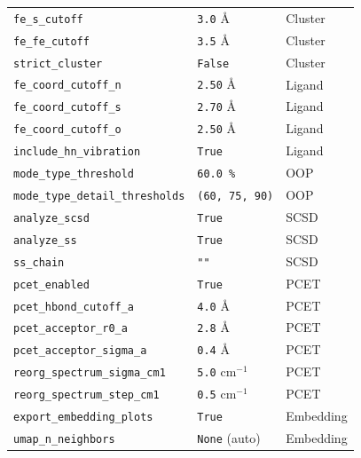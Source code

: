 \documentclass[11pt,a4paper,twoside]{article}
\theoremstyle{remark}
\begin{document}
\begin{longtable}{p{} p{} p{}}
\texttt{fe\_s\_cutoff}              & \texttt{3.0} \AA     & Cluster \\
\texttt{fe\_fe\_cutoff}             & \texttt{3.5} \AA     & Cluster \\
\texttt{strict\_cluster}            & \texttt{False}       & Cluster \\
\midrule
\texttt{fe\_coord\_cutoff\_n}       & \texttt{2.50} \AA    & Ligand \\
\texttt{fe\_coord\_cutoff\_s}       & \texttt{2.70} \AA    & Ligand \\
\texttt{fe\_coord\_cutoff\_o}       & \texttt{2.50} \AA    & Ligand \\
\texttt{include\_hn\_vibration}     & \texttt{True}        & Ligand \\
\midrule
\texttt{mode\_type\_threshold}      & \texttt{60.0\,\%}    & OOP \\
\texttt{mode\_type\_detail\_thresholds} & \texttt{(60, 75, 90)} & OOP \\
\midrule
\texttt{analyze\_scsd}              & \texttt{True}        & SCSD \\
\texttt{analyze\_ss}                & \texttt{True}        & SCSD \\
\texttt{ss\_chain}                  & \texttt{""}          & SCSD \\
\midrule
\texttt{pcet\_enabled}              & \texttt{True}        & PCET \\
\texttt{pcet\_hbond\_cutoff\_a}     & \texttt{4.0} \AA     & PCET \\
\texttt{pcet\_acceptor\_r0\_a}      & \texttt{2.8} \AA     & PCET \\
\texttt{pcet\_acceptor\_sigma\_a}   & \texttt{0.4} \AA     & PCET \\
\texttt{reorg\_spectrum\_sigma\_cm1} & \texttt{5.0} cm$^{-1}$  & PCET \\
\texttt{reorg\_spectrum\_step\_cm1} & \texttt{0.5} cm$^{-1}$  & PCET \\
\midrule
\texttt{export\_embedding\_plots}   & \texttt{True}        & Embedding \\
\texttt{umap\_n\_neighbors}         & \texttt{None} (auto) & Embedding \\
\midrule

\end{longtable}
\end{document}
